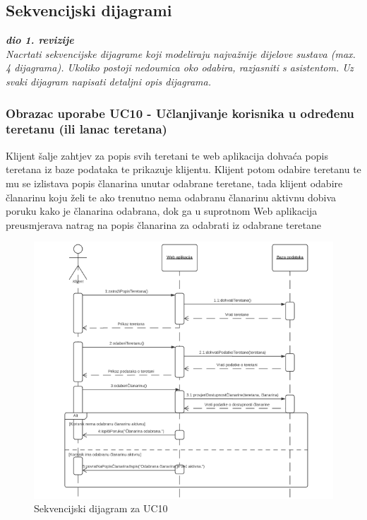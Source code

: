 				
				\eject
				
				
			\subsection{Sekvencijski dijagrami}
				
				\textbf{\textit{dio 1. revizije}}\\
				
				\textit{Nacrtati sekvencijske dijagrame koji modeliraju najvažnije dijelove sustava (max. 4 dijagrama). Ukoliko postoji nedoumica oko odabira, razjasniti s asistentom. Uz svaki dijagram napisati detaljni opis dijagrama.}
				
					\subsubsection{Obrazac uporabe UC10 - Učlanjivanje korisnika u određenu teretanu (ili lanac teretana)}
					\textit{}Klijent šalje zahtjev za popis svih teretani te web aplikacija dohvaća popis teretana
                    iz baze podataka te prikazuje klijentu. Klijent potom odabire teretanu te mu se izlistava
                    popis članarina unutar odabrane teretane, tada klijent odabire članarinu koju želi te 
                    ako trenutno nema odabranu članarinu aktivnu dobiva poruku kako je članarina odabrana, 
                    dok ga u suprotnom Web aplikacija preusmjerava natrag na popis članarina za odabrati
                    iz odabrane teretane\\
                    
                    \begin{figure}[H]
			            \includegraphics[scale=0.9]{slike/UC10.PNG} %
			            \centering
			            \caption{Sekvencijski dijagram za UC10}
			            \label{fig:promjene}
		            \end{figure}
                    
